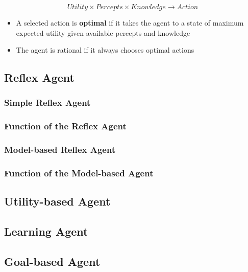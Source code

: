 \documentclass[conference, a4paper]{styles/acmsiggraph}
\begin{document}
        $$Utility \times Percepts \times Knowledge \longrightarrow Action$$
        
        \begin{itemize}
            \item A selected action is \textbf{optimal} if it takes the agent to a state of maximum expected utility given available percepts and knowledge
            \item The agent is rational if it always chooses optimal actions
        \end{itemize}
        
    \subsection{Reflex Agent}
        \subsubsection{Simple Reflex Agent}
        \subsubsection{Function of the Reflex Agent}
        \subsubsection{Model-based Reflex Agent}
        \subsubsection{Function of the Model-based Agent}
    \subsection{Utility-based Agent}
    \subsection{Learning Agent}
    \subsection{Goal-based Agent}
        
        
        
        
        
        
\end{document}
